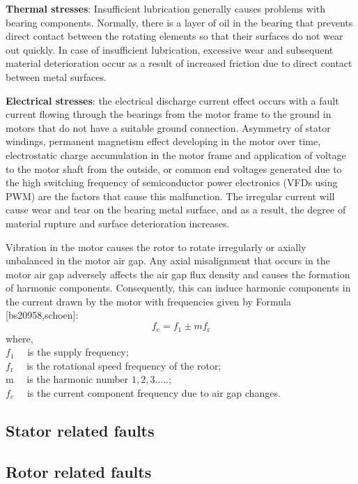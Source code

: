 \textbf{Thermal stresses}: Insufficient lubrication generally causes problems with bearing components. Normally, there is a layer of oil in the bearing that prevents direct contact between the rotating elements so that their surfaces do not wear out quickly. In case of insufficient lubrication, excessive wear and subsequent material deterioration occur as a result of increased friction due to direct contact between metal surfaces.

\textbf{Electrical stresses}: the electrical discharge current effect occurs with a fault current flowing through the bearings from the motor frame to the ground in motors that do not have a suitable ground connection. Asymmetry of stator windings, permanent magnetism effect developing in the motor over time, electrostatic charge accumulation in the motor frame and application of voltage to the motor shaft from the outside, or common end voltages generated due to the high switching frequency of semiconductor power electronics (VFDs using PWM) are the factors that cause this malfunction. The irregular current will cause wear and tear on the bearing metal surface, and as a result, the degree of material rupture and surface deterioration increases.

Vibration in the motor causes the rotor to rotate irregularly or axially unbalanced in the motor air gap. Any axial misalignment that occurs in the motor air gap adversely affects the air gap flux density and causes the formation of harmonic components. Consequently, this can induce harmonic components in the current drawn by the motor with frequencies given by Formula [bs20958,schoen]:
\begin{equation}
	f_{e}=f_{1} \pm m f_{\mathrm{r}}
	\label{bearingfault}
\end{equation}
where,\\
$f_{1} \quad$ is the supply frequency;\\
$f_{\mathrm{r}} \quad$ is the rotational speed frequency of the rotor;\\
$\mathrm{m} \quad$ is the harmonic number $1,2,3 \ldots$..;\\
$f_{e} \quad$ is the current component frequency due to air gap changes.

\subsection{Stator related faults}


\subsection{Rotor related faults}





